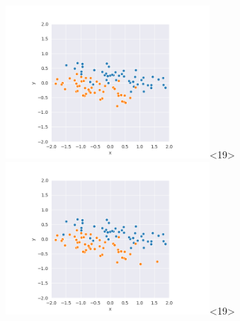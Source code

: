 \begin{frame}
  \includegraphics[width=3in]{../png/single_stretch/single_stretch_91.png}<19>
  \includegraphics[width=3in]{../png/single_stretch/single_stretch_96.png}<19>
  
\end{frame}
    
